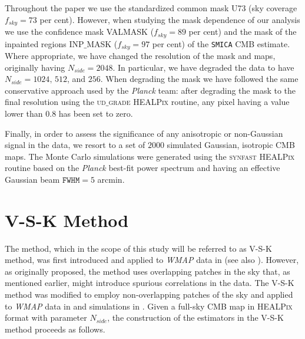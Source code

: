 Throughout the paper we use the standardized common mask U73 (sky coverage $f_{sky} = 73$ per cent). However, when studying the mask dependence of our analysis we use the confidence mask VALMASK ($f_{sky} = 89$ per cent) and the mask of the inpainted regions INP$\_$MASK ($f_{sky} = 97$ per cent) of the \texttt{SMICA} CMB estimate. Where appropriate, we have changed the resolution of the mask and maps, originally having $N_{side}=2048$. In particular, we have degraded the data to have $N_{side}=1024,\, 512$, and $256$. When degrading the mask we have followed the same conservative approach used by the \textit{Planck} team: after degrading the mask to the final resolution using the \textsc{ud$\_$grade HEALPix} routine, any pixel having a value lower than $0.8$ has been set to zero. 

Finally, in order to assess the significance of any anisotropic or non-Gaussian signal in the data, we resort to a set of $2000$ simulated Gaussian, isotropic CMB maps. The Monte Carlo simulations were generated using the \textsc{synfast HEALPix} routine based on the \textit{Planck} best-fit power spectrum and having an effective Gaussian beam $\texttt{FWHM}=5$ arcmin.

\section{V-S-K Method}
\label{s:method}

The method, which in the scope of this study will be referred to as V-S-K method, was first introduced and applied to \textit{WMAP} data in \cite{Bernui:2008ei}  (see also \cite{Bernui:2009wq,Bernui:2011yj}). However, as originally proposed, the method uses overlapping patches in the sky that, as mentioned earlier, might introduce spurious correlations in the data. The V-S-K method was modified to employ non-overlapping patches of the sky and applied to \textit{WMAP} data in \cite{Cardona:2013pqa} and simulations in \cite{Cardona:2013fxa}. Given a full-sky CMB map in \textsc{HEALPix} format with parameter $N_{side}$, the construction of the estimators in the V-S-K method proceeds as follows. 

